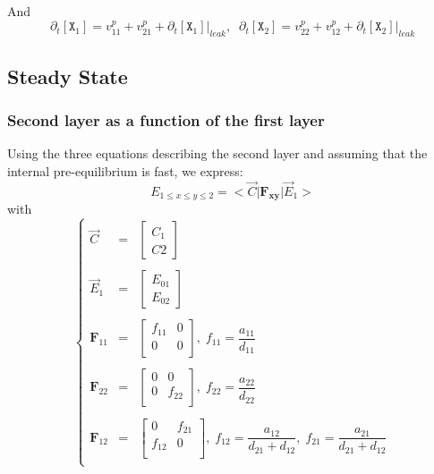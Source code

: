 \documentclass[aps,onecolumn,12pt]{revtex4}
\newcommand{\mychem}[1]{\mathtt{#1}}
\newcommand{\myconc}[1]{\left[#1\right]}
\newcommand{\spx}{\mychem{X}}
\newcommand{\mymat}[1]{{\bm{#1}}}
\begin{document}
And
\begin{equation}
	\partial_t \myconc{\spx_1} = v^p_{11}+v^p_{21} + \partial_t \myconc{\spx_1}\vert_{leak},\;\;
	\partial_t \myconc{\spx_2} = v^p_{22}+v^p_{12} + \partial_t \myconc{\spx_2}\vert_{leak}
\end{equation}

\subsection{Steady State}

\subsubsection{Second layer as a function of the first layer}
Using the three equations describing the second layer and assuming that the internal pre-equilibrium is fast, we express:
\begin{equation}
\boxed{
E_{1\leq x \leq y \leq 2 } = <{\vec{C}} \vert \mymat{F_{xy}} \vert \vec{E}_1 >
}
\end{equation}
with
\begin{equation}
\left\lbrace
\begin{array}{rcl}
\vec{C}   & = & \begin{bmatrix} C_1 \\ C2 \end{bmatrix}\\
\\
\vec{E}_1 & = & \begin{bmatrix} E_{01} \\ E_{02} \end{bmatrix}\\
\\
\mymat{F}_{11} & = & 
\begin{bmatrix}
	f_{11} & 0 \\
	0 & 0\\
\end{bmatrix}, \; f_{11} = \dfrac{a_{11}}{d_{11}}\\
\\
\mymat{F}_{22} & = & 
\begin{bmatrix}
	0 & 0 \\
	0 & f_{22}\\
\end{bmatrix}, \; f_{22} = \dfrac{a_{22}}{d_{22}}\\
\\
\mymat{F}_{12} & = & 
\begin{bmatrix}
	0 & f_{21}\\
	f_{12} & 0\\
\end{bmatrix}, \; f_{12} = \dfrac{a_{12}}{d_{21}+d_{12}},\; f_{21} = \dfrac{a_{21}}{d_{21}+d_{12}}\\
\end{array}
\right.
\end{equation}
\end{document}
